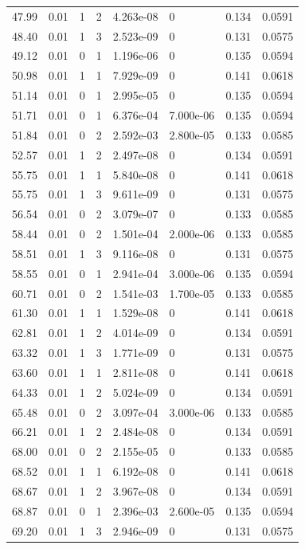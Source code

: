 \documentclass[preview]{standalone}
\begin{document}
{{{\begin{tabular}{L{1.2cm}C{1.2cm} C{0.3cm}C{0.5cm} C{1.4cm}C{1.4cm} C{1.4cm}C{1.4cm}}
  47.99  &  0.01  & 1     &  2 &  4.263e-08  & 0  & 0.134 &  0.0591   \\ 
  48.40  &  0.01  & 1     &  3 &  2.523e-09  & 0  & 0.131 &  0.0575   \\ 
  49.12  &  0.01  & 0     &  1 &  1.196e-06  & 0  & 0.135 &  0.0594   \\ 
  50.98  &  0.01  & 1     &  1 &  7.929e-09  & 0  & 0.141 &  0.0618   \\ 
  51.14  &  0.01  & 0     &  1 &  2.995e-05  & 0  & 0.135 &  0.0594   \\ 
  51.71  &  0.01  & 0     &  1 &  6.376e-04  & 7.000e-06  & 0.135 &  0.0594   \\ 
  51.84  &  0.01  & 0     &  2 &  2.592e-03  & 2.800e-05  & 0.133 &  0.0585   \\ 
  52.57  &  0.01  & 1     &  2 &  2.497e-08  & 0  & 0.134 &  0.0591   \\ 
  55.75  &  0.01  & 1     &  1 &  5.840e-08  & 0  & 0.141 &  0.0618   \\ 
  55.75  &  0.01  & 1     &  3 &  9.611e-09  & 0  & 0.131 &  0.0575   \\ 
  56.54  &  0.01  & 0     &  2 &  3.079e-07  & 0  & 0.133 &  0.0585   \\ 
  58.44  &  0.01  & 0     &  2 &  1.501e-04  & 2.000e-06  & 0.133 &  0.0585   \\ 
  58.51  &  0.01  & 1     &  3 &  9.116e-08  & 0  & 0.131 &  0.0575   \\ 
  58.55  &  0.01  & 0     &  1 &  2.941e-04  & 3.000e-06  & 0.135 &  0.0594   \\ 
  60.71  &  0.01  & 0     &  2 &  1.541e-03  & 1.700e-05  & 0.133 &  0.0585   \\ 
  61.30  &  0.01  & 1     &  1 &  1.529e-08  & 0  & 0.141 &  0.0618   \\ 
  62.81  &  0.01  & 1     &  2 &  4.014e-09  & 0  & 0.134 &  0.0591   \\ 
  63.32  &  0.01  & 1     &  3 &  1.771e-09  & 0  & 0.131 &  0.0575   \\ 
  63.60  &  0.01  & 1     &  1 &  2.811e-08  & 0  & 0.141 &  0.0618   \\ 
  64.33  &  0.01  & 1     &  2 &  5.024e-09  & 0  & 0.134 &  0.0591   \\ 
  65.48  &  0.01  & 0     &  2 &  3.097e-04  & 3.000e-06  & 0.133 &  0.0585   \\ 
  66.21  &  0.01  & 1     &  2 &  2.484e-08  & 0  & 0.134 &  0.0591   \\ 
  68.00  &  0.01  & 0     &  2 &  2.155e-05  & 0  & 0.133 &  0.0585   \\ 
  68.52  &  0.01  & 1     &  1 &  6.192e-08  & 0  & 0.141 &  0.0618   \\ 
  68.67  &  0.01  & 1     &  2 &  3.967e-08  & 0  & 0.134 &  0.0591   \\ 
  68.87  &  0.01  & 0     &  1 &  2.396e-03  & 2.600e-05  & 0.135 &  0.0594   \\ 
  69.20  &  0.01  & 1     &  3 &  2.946e-09  & 0  & 0.131 &  0.0575   \\ 
\hline 
\end{tabular} 

}}}
\end{document}
